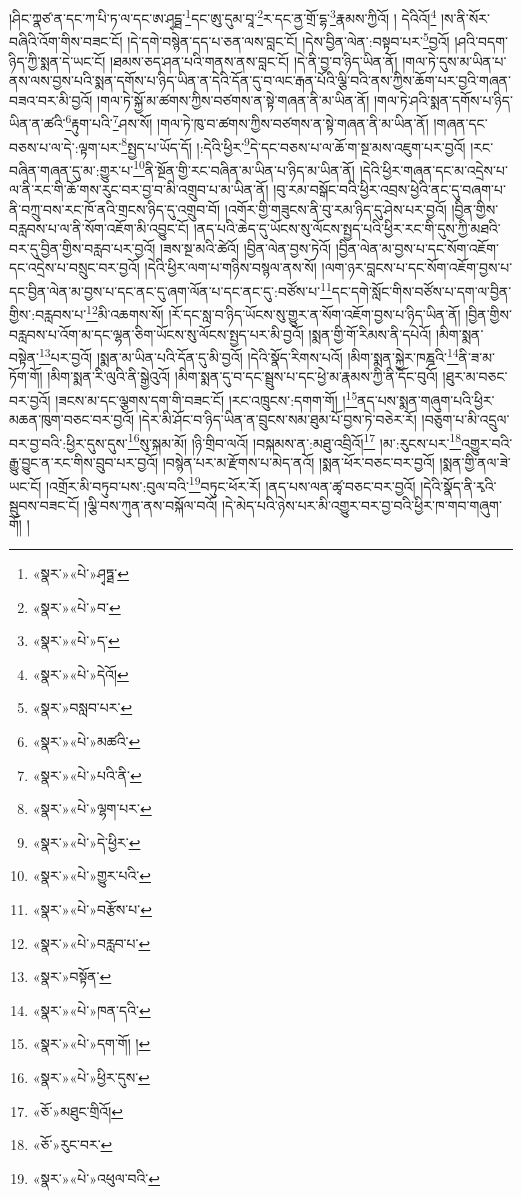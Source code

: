 །ཤིང་ཀྣཙ་ན་དང་ཀ་པི་ཏ་ལ་དང་ཨ་ཤྭདྠ་\footnote{«སྣར་»«པེ་»ཤྭཏྠ་}དང་ཨུ་དུམ་བཱ་\footnote{«སྣར་»«པེ་»བ་}ར་དང་ནྱ་གྲོ་དྷ་\footnote{«སྣར་»«པེ་»ད་}རྣམས་ཀྱིའོ། །
དེའིའོ།\footnote{«སྣར་»«པེ་»དེའོ།} །ས་ནི་སོར་བཞིའི་འོག་གིས་བཟང་ངོ། །དེ་དགེ་བསྙེན་དད་པ་ཅན་ལས་བླང་ངོ། །དེས་བྱིན་ལེན་:བསྟབ་པར་\footnote{«སྣར་»བསླབ་པར་}བྱའོ། །ཤའི་བདག་ཉིད་ཀྱི་སྨན་དེ་ཡང་ངོ། །ཐམས་ཅད་ཤན་པའི་གནས་ནས་བླང་ངོ། །དེ་ནི་བྱ་བ་ཉིད་ཡིན་ནོ། །གལ་ཏེ་དུས་མ་ཡིན་པ་ནས་ལས་བྱས་པའི་སྨན་དགོས་པ་ཉིད་ཡིན་ན་དེའི་དོན་དུ་བ་ལང་རྒན་པོའི་ལྕི་བའི་ནས་ཀྱིས་ཆོག་པར་བྱའི་གཞན་བཟའ་བར་མི་བྱའོ། །གལ་ཏེ་སྐྱོ་མ་ཚགས་ཀྱིས་བཙགས་ན་སྟེ་གཞན་ནི་མ་ཡིན་ནོ། །གལ་ཏེ་ཤའི་སྨན་དགོས་པ་ཉིད་ཡིན་ན་ཚའི་\footnote{«སྣར་»«པེ་»མཚའི་}རྟུག་པའི་\footnote{«སྣར་»«པེ་»པའི་ནི་}ཤས་སོ། །གལ་ཏེ་ཁུ་བ་ཚགས་ཀྱིས་བཙགས་ན་སྟེ་གཞན་ནི་མ་ཡིན་ནོ། །གཞན་དང་བཅས་པ་ལ་དེ་:ལྟག་པར་\footnote{«སྣར་»«པེ་»ལྷག་པར་}སྤྱད་པ་ཡོད་དོ། །:དེའི་ཕྱིར་\footnote{«སྣར་»«པེ་»དེ་ཕྱིར་}དེ་དང་བཅས་པ་ལ་ཆོ་ག་སྔ་མས་འཇུག་པར་བྱའོ། །རང་བཞིན་གཞན་དུ་མ་:གྱུར་པ་\footnote{«སྣར་»«པེ་»གྱུར་པའི་}ནི་སྔོན་གྱི་རང་བཞིན་མ་ཡིན་པ་ཉིད་མ་ཡིན་ནོ། །དེའི་ཕྱིར་གཞན་དང་མ་འདྲེས་པ་ལ་ནི་རང་གི་ཆོ་གས་རུང་བར་བྱ་བ་མི་འགྲུབ་པ་མ་ཡིན་ནོ། །བུ་རམ་བསྒོང་བའི་ཕྱིར་འབྲས་ཕྱེའི་ནང་དུ་བཞག་པ་ནི་བཀྲུ་བས་རང་ཁོ་ནའི་གྲངས་ཉིད་དུ་འགྲུབ་བོ། །འགོར་གྱི་གཟུངས་ནི་བུ་རམ་ཉིད་དུ་ཤེས་པར་བྱའོ། །བྱིན་གྱིས་བརླབས་པ་ལ་ནི་སོག་འཇོག་མི་འབྱུང་ངོ། །ནད་པའི་ཆེད་དུ་ཡོངས་སུ་ལོངས་སྤྱད་པའི་ཕྱིར་རང་གི་དུས་ཀྱི་མཐའི་བར་དུ་བྱིན་གྱིས་བརླབ་པར་བྱའོ། །ཟས་སྔ་མའི་ཚེའོ། །བྱིན་ལེན་བྱས་ཏེའོ། །བྱིན་ལེན་མ་བྱས་པ་དང་སོག་འཇོག་དང་འདྲེས་པ་བསྲུང་བར་བྱའོ། །དེའི་ཕྱིར་ལག་པ་གཉིས་བསྙལ་ནས་སོ། །ལག་ཉར་བླངས་པ་དང་སོག་འཇོག་བྱས་པ་དང་བྱིན་ལེན་མ་བྱས་པ་དང་ནང་དུ་ཞག་ལོན་པ་དང་ནང་དུ་:བཙོས་པ་\footnote{«སྣར་»«པེ་»བརྩོས་པ་}དང་དགེ་སློང་གིས་བཙོས་པ་དག་ལ་བྱིན་གྱིས་:བརླབས་པ་\footnote{«སྣར་»«པེ་»བརླབ་པ་}མི་འཆགས་སོ། །རོ་དང་སླ་བ་ཉིད་ཡོངས་སུ་གྱུར་ན་སོག་འཇོག་བྱས་པ་ཉིད་ཡིན་ནོ། །བྱིན་གྱིས་བརླབས་པ་འོག་མ་དང་ལྷན་ཅིག་ཡོངས་སུ་ལོངས་སྤྱད་པར་མི་བྱའོ། །སྨན་གྱི་གོ་རིམས་ནི་དཔེའོ། །མིག་སྨན་བསྟེན་\footnote{«སྣར་»བསྟོན་}པར་བྱའོ། །སྨན་མ་ཡིན་པའི་དོན་དུ་མི་བྱའོ། །དེའི་སྣོད་རིགས་པའོ། །མིག་སྨན་སྐྱེར་ཁཎྜའི་\footnote{«སྣར་»«པེ་»ཁན་དའི་}ནི་ཟ་མ་ཏོག་གོ། །མིག་སྨན་རི་ལུའི་ནི་སྒྱེའུའོ། །མིག་སྨན་དུ་བ་དང་སྦྲུས་པ་དང་ཕྱེ་མ་རྣམས་ཀྱི་ནི་དོང་བུའོ། །ཐུར་མ་བཅང་བར་བྱའོ། །ཟངས་མ་དང་ལྕགས་དག་གི་བཟང་ངོ། །རང་འཁྲུངས་:དགག་གོ། །\footnote{«སྣར་»«པེ་»དག་གོ། །}ནད་པས་སྨན་གཞུག་པའི་ཕྱིར་མཆན་ཁུག་བཅང་བར་བྱའོ། །དེར་མི་ཤོང་བ་ཉིད་ཡིན་ན་བྲུངས་སམ་ཐུམ་པོ་བྱས་ཏེ་བཅེར་རོ། །བཅུག་པ་མི་འདྲུལ་བར་བྱ་བའི་:ཕྱིར་དུས་དུས་\footnote{«སྣར་»«པེ་»ཕྱིར་དུས་}སུ་སྐམ་མོ། །ཉི་གྲིབ་ལའོ། །བསྐམས་ན་:མཐུ་འབྲིའོ།\footnote{«ཅོ་»མཐུང་གྲིའོ།} །མ་:རུངས་པར་\footnote{«ཅོ་»རུང་བར་}འགྱུར་བའི་རྒྱུ་བྱུང་ན་རང་གིས་བྲུབ་པར་བྱའོ། །བསྙེན་པར་མ་རྫོགས་པ་མེད་ནའོ། །སྨན་ཕོར་བཅང་བར་བྱའོ། །སྨན་གྱི་ནལ་ཟེ་ཡང་ངོ། །འགྲོར་མི་བཏུབ་པས་:བུལ་བའི་\footnote{«སྣར་»«པེ་»འཕུལ་བའི་}བཏུང་ཕོར་རོ། །ནད་པས་ལན་ཚྭ་བཅང་བར་བྱའོ། །དེའི་སྣོད་ནི་རྭའི་སྦུབས་བཟང་ངོ། །ལྕི་བས་ཀུན་ནས་བསྐོལ་བའོ། །དེ་མེད་པའི་ཉེས་པར་མི་འགྱུར་བར་བྱ་བའི་ཕྱིར་ཁ་གབ་གཞུག་གོ། །
